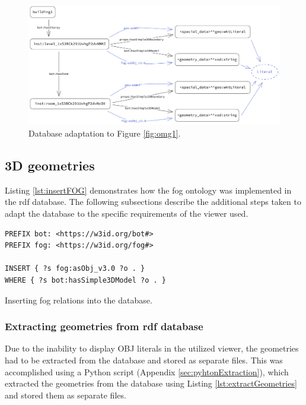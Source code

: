 \begin{figure}[H]
    \centering
    \includegraphics[width=\textwidth]{figures/pdf/dbadaptation.pdf}
    \caption[Database adaptation]{Database adaptation to Figure \ref{fig:omg1}.}
    \label{fig:dbadaptation}
\end{figure}

\subsection{3D geometries}
Listing \ref{lst:insertFOG} demonstrates how the \ac{fog} ontology was implemented in the \ac{rdf} database. The following subsections describe the additional steps taken to adapt the database to the specific requirements of the viewer used.

\begin{listing}[H]
    \begin{verbatim}
PREFIX bot: <https://w3id.org/bot#>
PREFIX fog: <https://w3id.org/fog#>

INSERT { ?s fog:asObj_v3.0 ?o . }
WHERE { ?s bot:hasSimple3DModel ?o . }
    \end{verbatim}
    \caption[Inserting \acs{fog} relations]{Inserting \acs{fog} relations into the database.}
    \label{lst:insertFOG}
\end{listing}

\subsubsection{Extracting geometries from \ac{rdf} database}
Due to the inability to display OBJ literals in the utilized viewer, the geometries had to be extracted from the database and stored as separate files. This was accomplished using a Python script (Appendix \ref{sec:pyhtonExtraction}), which extracted the geometries from the database using Listing \ref{lst:extractGeometries} and stored them as separate files.

